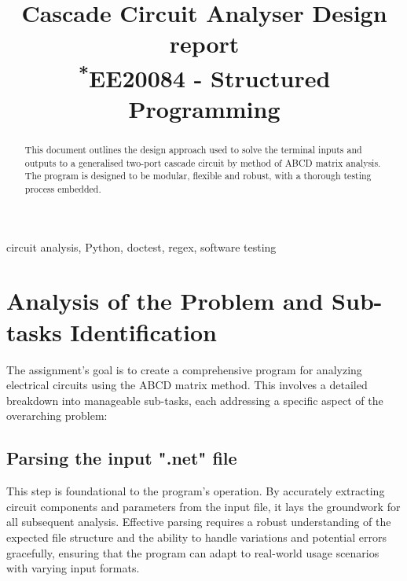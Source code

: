 \documentclass[conference]{IEEEtran}
\begin{document}
\title{Cascade Circuit Analyser Design report\\
{\footnotesize \textsuperscript{*}EE20084 - Structured Programming}
}

\author{
}
\maketitle

\begin{abstract}
This document outlines the design approach used to solve the terminal inputs and outputs to a generalised two-port cascade
circuit by method of ABCD matrix analysis. The program is designed to be modular, flexible and robust, with a thorough testing process
embedded.
\end{abstract}

\begin{IEEEkeywords}
circuit analysis, Python, doctest, regex, software testing
\end{IEEEkeywords}

\tableofcontents

\section{Analysis of the Problem and Sub-tasks Identification}

The assignment's goal is to create a comprehensive program for analyzing electrical circuits using the ABCD matrix method. This involves a detailed breakdown into manageable sub-tasks, each addressing a specific aspect of the overarching problem:

\subsection{\textbf{Parsing the input ".net" file}}
This step is foundational to the program's operation. By accurately extracting circuit components and parameters from the input file, it lays the groundwork for all subsequent analysis. Effective parsing requires a robust understanding of the expected file structure and the ability to handle variations and potential errors gracefully, ensuring that the program can adapt to real-world usage scenarios with varying input formats.
\end{document}
